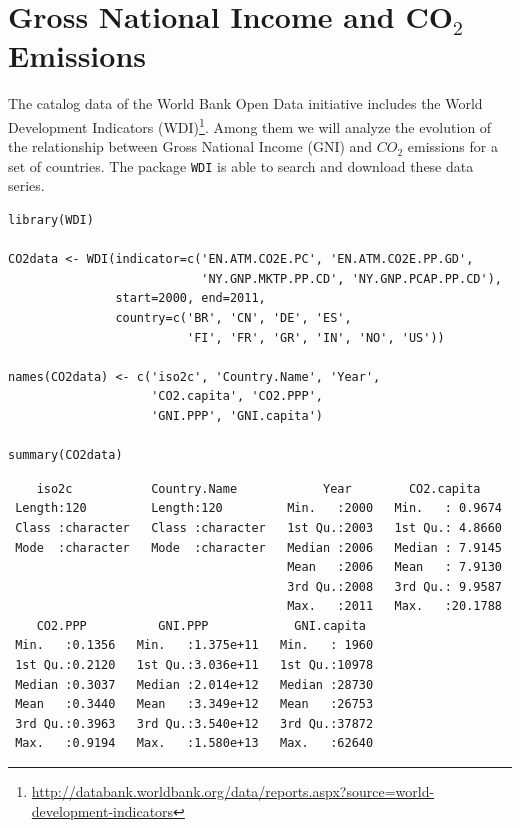 \documentclass[smallroyalvopaper]{memoir}
\begin{document}
\section{Gross National Income and CO\(_{\text{2}}\) Emissions}
\label{sec:org9ba3273}
The catalog data of the World Bank Open Data initiative includes the
World Development Indicators (WDI)\footnote{\url{http://databank.worldbank.org/data/reports.aspx?source=world-development-indicators}}. Among them we will analyze
the evolution of the relationship between Gross National Income (GNI)
and \(CO_2\) emissions for a set of countries. The package \texttt{WDI} is able
to search and download these data series.


\lstset{language=r,label= ,caption= ,captionpos=b,numbers=none}
\begin{lstlisting}
library(WDI)
    
CO2data <- WDI(indicator=c('EN.ATM.CO2E.PC', 'EN.ATM.CO2E.PP.GD',
                           'NY.GNP.MKTP.PP.CD', 'NY.GNP.PCAP.PP.CD'),
               start=2000, end=2011,
               country=c('BR', 'CN', 'DE', 'ES',
                         'FI', 'FR', 'GR', 'IN', 'NO', 'US'))

names(CO2data) <- c('iso2c', 'Country.Name', 'Year',
                    'CO2.capita', 'CO2.PPP',
                    'GNI.PPP', 'GNI.capita')

summary(CO2data)
\end{lstlisting}

\begin{verbatim}
    iso2c           Country.Name            Year        CO2.capita     
 Length:120         Length:120         Min.   :2000   Min.   : 0.9674  
 Class :character   Class :character   1st Qu.:2003   1st Qu.: 4.8660  
 Mode  :character   Mode  :character   Median :2006   Median : 7.9145  
                                       Mean   :2006   Mean   : 7.9130  
                                       3rd Qu.:2008   3rd Qu.: 9.9587  
                                       Max.   :2011   Max.   :20.1788  
    CO2.PPP          GNI.PPP            GNI.capita   
 Min.   :0.1356   Min.   :1.375e+11   Min.   : 1960  
 1st Qu.:0.2120   1st Qu.:3.036e+11   1st Qu.:10978  
 Median :0.3037   Median :2.014e+12   Median :28730  
 Mean   :0.3440   Mean   :3.349e+12   Mean   :26753  
 3rd Qu.:0.3963   3rd Qu.:3.540e+12   3rd Qu.:37872  
 Max.   :0.9194   Max.   :1.580e+13   Max.   :62640
\end{verbatim}
\end{document}
